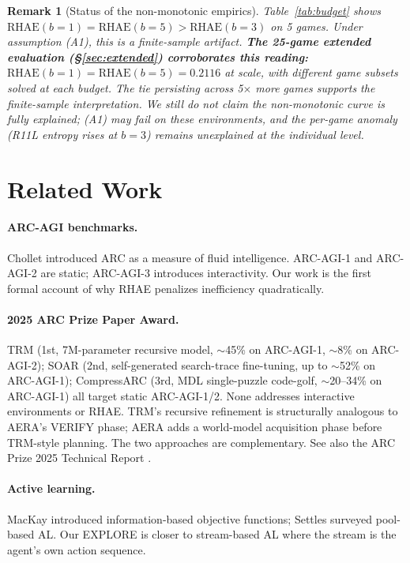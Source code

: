\documentclass[11pt]{article}
\newtheorem{remark}{Remark}
\begin{document}
\begin{remark}[Status of the non-monotonic empirics]
Table~\ref{tab:budget} shows $\text{RHAE}(b{=}1) = \text{RHAE}(b{=}5) > \text{RHAE}(b{=}3)$ on 5 games. Under assumption (A1), this is a finite-sample artifact. \textbf{The 25-game extended evaluation (\S\ref{sec:extended}) corroborates this reading:} $\text{RHAE}(b{=}1) = \text{RHAE}(b{=}5) = 0.2116$ at scale, with different game subsets solved at each budget. The tie persisting across 5$\times$ more games supports the finite-sample interpretation. We still do \emph{not} claim the non-monotonic curve is fully explained; (A1) may fail on these environments, and the per-game anomaly (R11L entropy rises at $b{=}3$) remains unexplained at the individual level.
\end{remark}

\section{Related Work}
\label{sec:related}

\paragraph{ARC-AGI benchmarks.} Chollet \cite{chollet2019} introduced ARC as a measure of fluid intelligence. ARC-AGI-1 and ARC-AGI-2 are static; ARC-AGI-3 \cite{arcprize2026} introduces interactivity. Our work is the first formal account of why RHAE penalizes inefficiency quadratically.

\paragraph{2025 ARC Prize Paper Award.} TRM \cite{trm2025} (1st, 7M-parameter recursive model, $\sim$45\% on ARC-AGI-1, $\sim$8\% on ARC-AGI-2); SOAR \cite{soar2025} (2nd, self-generated search-trace fine-tuning, up to $\sim$52\% on ARC-AGI-1); CompressARC \cite{compressarc2025} (3rd, MDL single-puzzle code-golf, $\sim$20--34\% on ARC-AGI-1) all target static ARC-AGI-1/2. None addresses interactive environments or RHAE. TRM's recursive refinement is structurally analogous to AERA's VERIFY phase; AERA adds a world-model acquisition phase before TRM-style planning. The two approaches are complementary. See also the ARC Prize 2025 Technical Report \cite{arcprize2025}.

\paragraph{Active learning.} MacKay \cite{mackay1992} introduced information-based objective functions; Settles \cite{settles2010} surveyed pool-based AL. Our EXPLORE is closer to stream-based AL where the stream is the agent's own action sequence.
\end{document}
